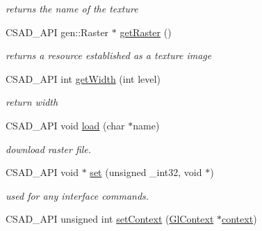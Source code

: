 \begin{DoxyCompactItemize}
\begin{DoxyCompactList}\small\item\em returns the name of the texture \end{DoxyCompactList}\item 
\hypertarget{classcsad_1_1_texture2_d_a0d71fbe8b8296da9b3bc2801b10259e7}{C\-S\-A\-D\-\_\-\-A\-P\-I gen\-::\-Raster $\ast$ \hyperlink{classcsad_1_1_texture2_d_a0d71fbe8b8296da9b3bc2801b10259e7}{get\-Raster} ()}\label{classcsad_1_1_texture2_d_a0d71fbe8b8296da9b3bc2801b10259e7}

\begin{DoxyCompactList}\small\item\em returns a resource established as a texture image \end{DoxyCompactList}\item 
\hypertarget{classcsad_1_1_texture2_d_af86e14a234c9a6da93eb805f6e2691ec}{C\-S\-A\-D\-\_\-\-A\-P\-I int \hyperlink{classcsad_1_1_texture2_d_af86e14a234c9a6da93eb805f6e2691ec}{get\-Width} (int level)}\label{classcsad_1_1_texture2_d_af86e14a234c9a6da93eb805f6e2691ec}

\begin{DoxyCompactList}\small\item\em return width \end{DoxyCompactList}\item 
\hypertarget{classcsad_1_1_texture2_d_a3dca71cef5aec246fed9929f0dc4b237}{C\-S\-A\-D\-\_\-\-A\-P\-I void \hyperlink{classcsad_1_1_texture2_d_a3dca71cef5aec246fed9929f0dc4b237}{load} (char $\ast$name)}\label{classcsad_1_1_texture2_d_a3dca71cef5aec246fed9929f0dc4b237}

\begin{DoxyCompactList}\small\item\em download raster file. \end{DoxyCompactList}\item 
\hypertarget{classcsad_1_1_texture2_d_aef53e63cfc69c07ad89dc7a36c7d6ba7}{C\-S\-A\-D\-\_\-\-A\-P\-I void $\ast$ \hyperlink{classcsad_1_1_texture2_d_aef53e63cfc69c07ad89dc7a36c7d6ba7}{set} (unsigned \-\_\-int32, void $\ast$)}\label{classcsad_1_1_texture2_d_aef53e63cfc69c07ad89dc7a36c7d6ba7}

\begin{DoxyCompactList}\small\item\em used for any interface commands. \end{DoxyCompactList}\item 
\hypertarget{classcsad_1_1_texture2_d_aacb2b9c5b55aba437a1c342ec67c301a}{C\-S\-A\-D\-\_\-\-A\-P\-I unsigned int \hyperlink{classcsad_1_1_texture2_d_aacb2b9c5b55aba437a1c342ec67c301a}{set\-Context} (\hyperlink{classcsad_1_1_gl_context}{Gl\-Context} $\ast$\hyperlink{classcsad_1_1_texture2_d_a32c50d44b46762a79df4d93039f75119}{context})}\label{classcsad_1_1_texture2_d_aacb2b9c5b55aba437a1c342ec67c301a}


\end{DoxyCompactItemize}
